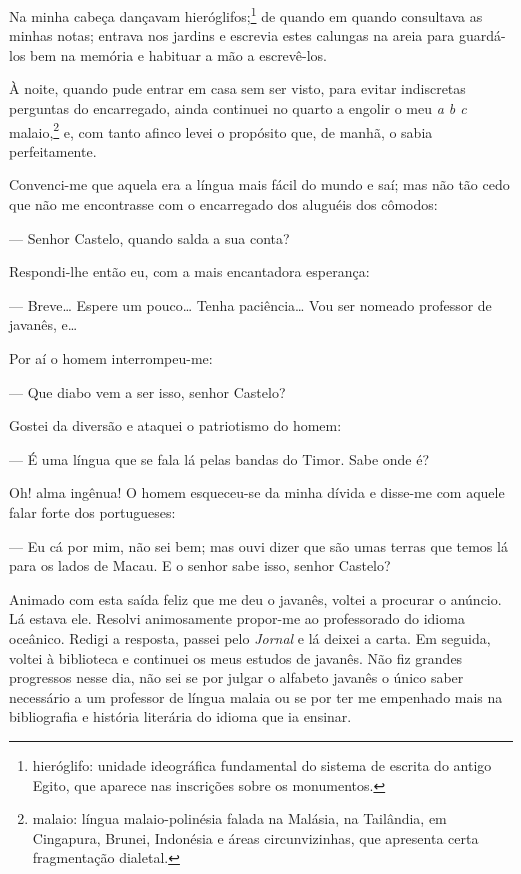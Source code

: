 Na minha cabeça dançavam hieróglifos;\footnote{hieróglifo: unidade
  ideográfica fundamental do sistema de escrita do antigo Egito, que
  aparece nas inscrições sobre os monumentos.} de quando em quando
consultava as minhas notas; entrava nos jardins e escrevia estes
calungas na areia para guardá-los bem na memória e habituar a mão a
escrevê-los.

À noite, quando pude entrar em casa sem ser visto, para evitar
indiscretas perguntas do encarregado, ainda continuei no quarto a
engolir o meu \emph{a b c} malaio,\footnote{malaio: língua
  malaio-polinésia falada na Malásia, na Tailândia, em Cingapura,
  Brunei, Indonésia e áreas circunvizinhas, que apresenta certa
  fragmentação dialetal.} e, com tanto afinco levei o propósito que, de
manhã, o sabia perfeitamente.

Convenci-me que aquela era a língua mais fácil do mundo e saí; mas não
tão cedo que não me encontrasse com o encarregado dos aluguéis dos
cômodos:

--- Senhor Castelo, quando salda a sua conta?

Respondi-lhe então eu, com a mais encantadora esperança:

--- Breve\ldots{} Espere um pouco\ldots{} Tenha paciência\ldots{} Vou
ser nomeado professor de javanês, e\ldots{}

Por aí o homem interrompeu-me:

--- Que diabo vem a ser isso, senhor Castelo?

Gostei da diversão e ataquei o patriotismo do homem:

--- É uma língua que se fala lá pelas bandas do Timor. Sabe onde é?

Oh! alma ingênua! O homem esqueceu-se da minha dívida e disse-me com
aquele falar forte dos portugueses:

--- Eu cá por mim, não sei bem; mas ouvi dizer que são umas terras que
temos lá para os lados de Macau. E o senhor sabe isso, senhor Castelo?

Animado com esta saída feliz que me deu o javanês, voltei a procurar o
anúncio. Lá estava ele. Resolvi animosamente propor-me ao professorado
do idioma oceânico. Redigi a resposta, passei pelo \emph{Jornal} e lá
deixei a carta. Em seguida, voltei à biblioteca e continuei os meus
estudos de javanês. Não fiz grandes progressos nesse dia, não sei se por
julgar o alfabeto javanês o único saber necessário a um professor de
língua malaia ou se por ter me empenhado mais na bibliografia e história
literária do idioma que ia ensinar.

